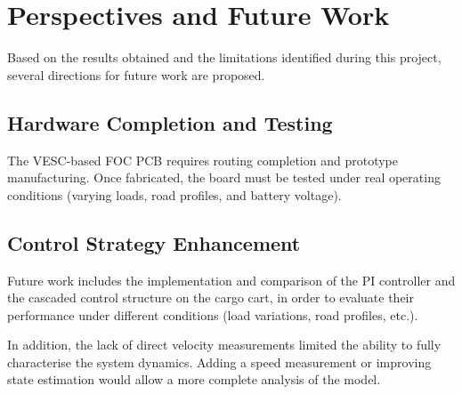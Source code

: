 
\section{Perspectives and Future Work}
Based on the results obtained and the limitations identified during this project, several directions for future work are proposed.

\subsection{Hardware Completion and Testing}
The VESC-based FOC PCB requires routing completion and prototype manufacturing. Once fabricated, the board must be tested under real operating conditions (varying loads, road profiles, and battery voltage).

\subsection{Control Strategy Enhancement}
Future work includes the implementation and comparison of the PI controller and the cascaded control structure on the cargo cart, in order to evaluate their performance under different conditions (load variations, road profiles, etc.).

In addition, the lack of direct velocity measurements limited the ability to fully characterise the system dynamics. Adding a speed measurement or improving state estimation would allow a more complete analysis of the model.



